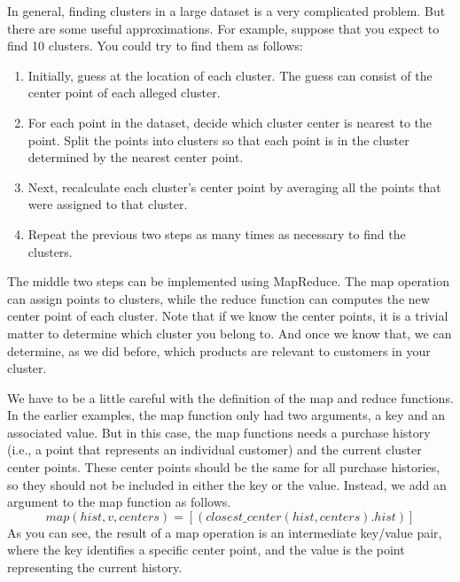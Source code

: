 In general, finding clusters in a large dataset is a very complicated problem.
But there are some useful approximations.  For example, suppose that you expect
to find 10 clusters.  You could try to find them as follows:
\begin{enumerate}
    \item Initially, guess at the location of each cluster.  The guess can consist
        of the center point of each alleged cluster.
    \item For each point in the dataset, decide which cluster center is nearest
        to the point.  Split the points into clusters so that each point is
        in the cluster determined by the nearest center point.
    \item Next, recalculate each cluster's center point by averaging all the
        points that were assigned to that cluster.
    \item Repeat the previous two steps as many times as necessary to find the
        clusters.
\end{enumerate}
The middle two steps can be implemented using MapReduce.  The map operation can
assign points to clusters, while the reduce function can computes the new center
point of each cluster.  Note that if we know the center points, it is a trivial
matter to determine which cluster you belong to.  And once we know that, we can
determine, as we did before, which products are relevant to customers in your
cluster.

We have to be a little careful with the definition of the map and reduce functions.
In the earlier examples, the map function only had two arguments, a key and an
associated value.  But in this case, the map functions needs a purchase history (i.e.,
a point that represents an individual customer) and the current cluster center
points.  These center points should be the same for all purchase histories, so
they should not be included in either the key or the value.  Instead, we add an
argument to the map function as follows.
\begin{displaymath}
map(hist, v, centers) = [ ( closest\_center(hist, centers) . hist ) ]
\end{displaymath}
As you can see, the result of a map operation is an intermediate key/value pair, where the key
identifies a specific center point, and the value is the point representing the
current history.

